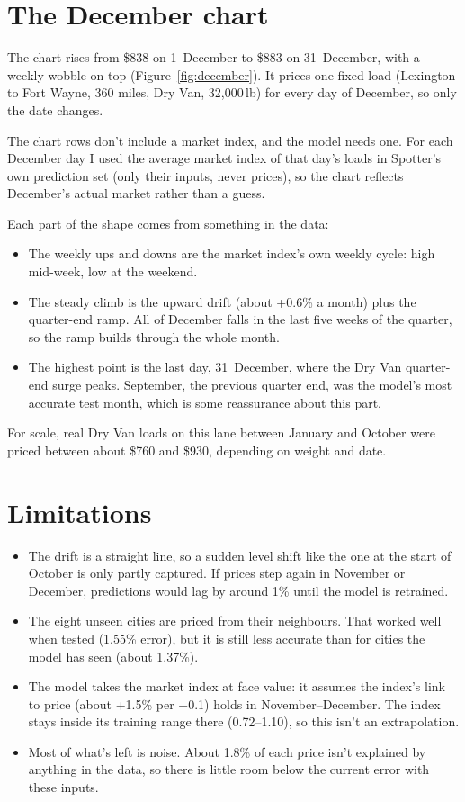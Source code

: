 \documentclass[10pt,twocolumn,letterpaper]{article}
\begin{document}
\section{The December chart}\label{sec:december}
\balance

The chart rises from \$838 on 1~December to \$883 on 31~December, with a weekly wobble on top (Figure~\ref{fig:december}). It prices one fixed load (Lexington to Fort Wayne, 360 miles, Dry Van, 32,000\,lb) for every day of December, so only the date changes.

The chart rows don't include a market index, and the model needs one. For each December day I used the average market index of that day's loads in Spotter's own prediction set (only their inputs, never prices), so the chart reflects December's actual market rather than a guess.

Each part of the shape comes from something in the data:
\begin{itemize}
  \item The weekly ups and downs are the market index's own weekly cycle: high mid-week, low at the weekend.
  \item The steady climb is the upward drift (about +0.6\% a month) plus the quarter-end ramp. All of December falls in the last five weeks of the quarter, so the ramp builds through the whole month.
  \item The highest point is the last day, 31~December, where the Dry Van quarter-end surge peaks. September, the previous quarter end, was the model's most accurate test month, which is some reassurance about this part.
\end{itemize}

For scale, real Dry Van loads on this lane between January and October were priced between about \$760 and \$930, depending on weight and date.

\section{Limitations}\label{sec:limitations}

\begin{itemize}
  \item The drift is a straight line, so a sudden level shift like the one at the start of October is only partly captured. If prices step again in November or December, predictions would lag by around 1\% until the model is retrained.
  \item The eight unseen cities are priced from their neighbours. That worked well when tested (1.55\% error), but it is still less accurate than for cities the model has seen (about 1.37\%).
  \item The model takes the market index at face value: it assumes the index's link to price (about +1.5\% per +0.1) holds in November--December. The index stays inside its training range there (0.72--1.10), so this isn't an extrapolation.
  \item Most of what's left is noise. About 1.8\% of each price isn't explained by anything in the data, so there is little room below the current error with these inputs.
\end{itemize}
\end{document}
